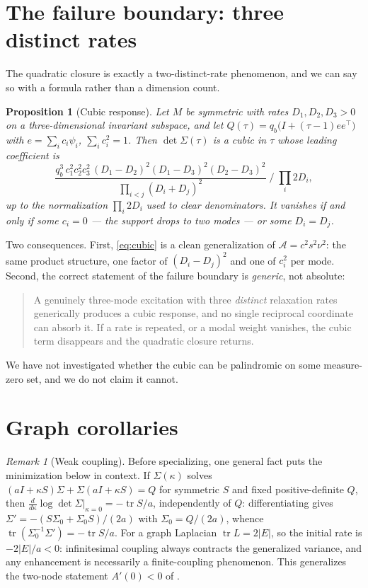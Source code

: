 \documentclass[11pt]{article}
\theoremstyle{plain}
\newtheorem{proposition}[theorem]{Proposition}
\theoremstyle{definition}
\theoremstyle{remark}
\newtheorem{remark}[theorem]{Remark}
\newcommand{\tr}{\operatorname{tr}}
\newcommand{\Sig}{\Sigma}
\newcommand{\Aco}{\mathcal{A}}
\newcommand{\T}{^{\!\top}}
\begin{document}
\section{The failure boundary: three distinct rates}\label{sec:threemode}

The quadratic closure is exactly a two-distinct-rate phenomenon, and we can say so with a
formula rather than a dimension count.

\begin{proposition}[Cubic response]\label{prop:cubic}
Let $M$ be symmetric with rates $D_1,D_2,D_3>0$ on a three-dimensional invariant subspace, and
let $Q(\tau)=q_b\bigl(I+(\tau-1)ee\T\bigr)$ with $e=\sum_ic_i\psi_i$, $\sum_ic_i^2=1$. Then
$\det\Sig(\tau)$ is a cubic in $\tau$ whose leading coefficient is
\begin{equation}
  \frac{q_b^3\,c_1^2c_2^2c_3^2\,(D_1-D_2)^2(D_1-D_3)^2(D_2-D_3)^2}
       {\prod_{i<j}(D_i+D_j)^2}\;\Big/\;\prod_i 2D_i, \label{eq:cubic}
\end{equation}
up to the normalization $\prod_i2D_i$ used to clear denominators. It vanishes if and only if
some $c_i=0$ --- the support drops to two modes --- or some $D_i=D_j$.
\end{proposition}

Two consequences. First, \eqref{eq:cubic} is a clean generalization of $\Aco=c^2s^2\nu^2$: the
same product structure, one factor of $(D_i-D_j)^2$ and one of $c_i^2$ per mode. Second, the
correct statement of the failure boundary is \emph{generic}, not absolute:

\begin{quote}
A genuinely three-mode excitation with three \emph{distinct} relaxation rates generically
produces a cubic response, and no single reciprocal coordinate can absorb it. If a rate is
repeated, or a modal weight vanishes, the cubic term disappears and the quadratic closure
returns.
\end{quote}

We have not investigated whether the cubic can be palindromic on some measure-zero set, and we
do not claim it cannot.

\section{Graph corollaries}\label{sec:graphs}

\begin{remark}[Weak coupling]\label{rem:weak}
Before specializing, one general fact puts the minimization below in context. If
$\Sig(\kappa)$ solves $(aI+\kappa S)\Sig+\Sig(aI+\kappa S)=Q$ for symmetric $S$ and fixed
positive-definite $Q$, then
$\tfrac{d}{d\kappa}\log\det\Sig|_{\kappa=0}=-\tr S/a$, independently of $Q$: differentiating
gives $\Sig'=-(S\Sig_0+\Sig_0S)/(2a)$ with $\Sig_0=Q/(2a)$, whence
$\tr(\Sig_0^{-1}\Sig')=-\tr S/a$. For a graph Laplacian $\tr L=2|E|$, so the initial rate is
$-2|E|/a<0$: infinitesimal coupling always contracts the generalized variance, and any
enhancement is necessarily a finite-coupling phenomenon. This generalizes the two-node statement
$A'(0)<0$ of \cite{DeJesus2026ou}.
\end{remark}
\end{document}
